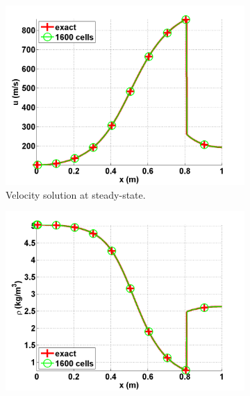 \documentclass[preprint,10pt]{elsarticle}
\begin{document}
\begin{figure}[H]
        \centering
        \begin{subfigure}[b]{0.495\textwidth}
                \centering
                \includegraphics[width=\textwidth]{vapor_velocity_numerical_and_exact_1600.png}
                \caption{Velocity solution at steady-state.}
                \label{fig:1d_nozzle_vap_vel}
        \end{subfigure}%
        \begin{subfigure}[b]{0.495\textwidth}
                \centering
                \includegraphics[width=\textwidth]{vapor_density_numerical_and_exact_1600.png}

\end{subfigure}
\end{figure}
\end{document}
